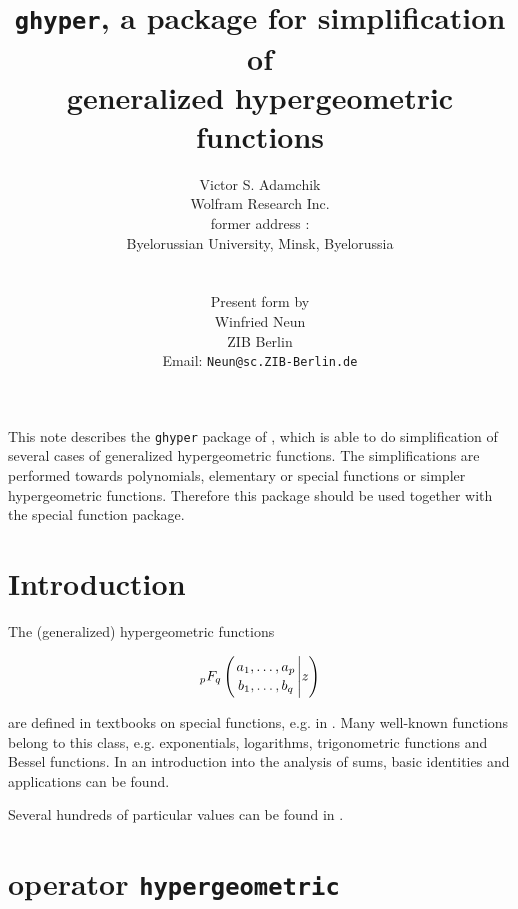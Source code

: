 \title{{\tt ghyper}, a package for simplification of \\
generalized hypergeometric functions}
\date{}
\author{Victor S. Adamchik\\
	Wolfram Research Inc. \\
	former address : \\
	Byelorussian University, Minsk, Byelorussia\\
\\
\\
	Present \REDUCE{} form by \\
	Winfried Neun \\
	ZIB Berlin \\
        Email: {\tt Neun@sc.ZIB-Berlin.de}}

\maketitle

This note describes the {\tt ghyper} package of \REDUCE{}, which is able
to do simplification of several cases of generalized hypergeometric functions. 
The simplifications are performed towards polynomials, elementary or
special functions or simpler hypergeometric functions.
Therefore this package should be used together with the \REDUCE{}
special function package.

\section{Introduction}

The (generalized) hypergeometric functions  

\begin{displaymath}
_pF_q \left( {{a_1, \ldots , a_p} \atop {b_1, \ldots ,b_q}} \Bigg\vert z \right)
\end{displaymath}

are defined in textbooks on special functions, e.g. in
\cite{Prudnikov:90}. Many well-known functions belong to this class,
e.g. exponentials, logarithms, trigonometric functions and Bessel functions.
In \cite{Graham:89} an introduction into the analysis of sums, basic
identities and applications can be found.

Several hundreds of particular values can be found in \cite{Prudnikov:90}.

\section{\REDUCE{} operator {\tt hypergeometric}}

